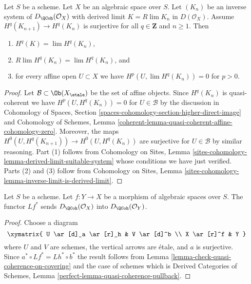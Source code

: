 \begin{lemma}
\label{lemma-Rlim-quasi-coherent}
Let $S$ be a scheme. Let $X$ be an algebraic space over $S$.
Let $(K_n)$ be an inverse system of
$D_\QCoh(\mathcal{O}_X)$ with derived limit
$K = R\lim K_n$ in $D(\mathcal{O}_X)$. Assume $H^q(K_{n + 1}) \to H^q(K_n)$
is surjective for all $q \in \mathbf{Z}$ and $n \geq 1$.
Then
\begin{enumerate}
\item $H^q(K) = \lim H^q(K_n)$,
\item $R\lim H^q(K_n) = \lim H^q(K_n)$, and
\item for every affine open $U \subset X$ we have
$H^p(U, \lim H^q(K_n)) = 0$ for $p > 0$.
\end{enumerate}
\end{lemma}

\begin{proof}
Let $\mathcal{B} \subset \Ob(X_\etale)$ be the set of affine objects.
Since $H^q(K_n)$ is quasi-coherent we have $H^p(U, H^q(K_n)) = 0$
for $U \in \mathcal{B}$ by the discussion in
Cohomology of Spaces, Section
\ref{spaces-cohomology-section-higher-direct-image}
and
Cohomology of Schemes, Lemma
\ref{coherent-lemma-quasi-coherent-affine-cohomology-zero}.
Moreover, the maps $H^0(U, H^q(K_{n + 1})) \to H^0(U, H^q(K_n))$
are surjective for $U \in \mathcal{B}$ by similar reasoning.
Part (1) follows from Cohomology on Sites, Lemma
\ref{sites-cohomology-lemma-derived-limit-suitable-system}
whose conditions we have just verified.
Parts (2) and (3) follow from
Cohomology on Sites, Lemma
\ref{sites-cohomology-lemma-inverse-limit-is-derived-limit}.
\end{proof}

\begin{lemma}
\label{lemma-quasi-coherence-pullback}
Let $S$ be a scheme.
Let $f : Y \to X$ be a morphism of algebraic spaces over $S$.
The functor $Lf^*$ sends $D_\QCoh(\mathcal{O}_X)$
into $D_\QCoh(\mathcal{O}_Y)$.
\end{lemma}

\begin{proof}
Choose a diagram
$$
\xymatrix{
U \ar[d]_a \ar[r]_h & V \ar[d]^b \\
X \ar[r]^f & Y
}
$$
where $U$ and $V$ are schemes, the vertical arrows are \'etale, and
$a$ is surjective. Since $a^* \circ Lf^* = Lh^* \circ b^*$ the result
follows from
Lemma \ref{lemma-check-quasi-coherence-on-covering}
and the case of schemes which is
Derived Categories of Schemes, Lemma
\ref{perfect-lemma-quasi-coherence-pullback}.
\end{proof}

